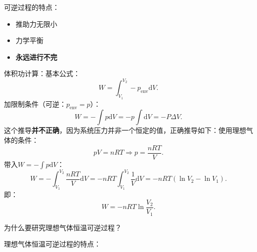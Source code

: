 可逆过程的特点：
\begin{itemize}
    \item 推助力无限小
    \item 力学平衡
    \item \textbf{永远进行不完}
\end{itemize}
体积功计算：基本公式：\[
    W = \int_{V_1}^{V_2} -p_\text{env} \mathrm{d}V
.\]
加限制条件（可逆：$p_\text{env}=p$）：\[
    W = -\int p\mathrm{d}V = -p \int \mathrm{d}V = -P\Delta V
.\]
这个推导\textbf{并不正确}，因为系统压力并非一个恒定的值，正确推导如下：使用理想气体的条件：\[
    pV=nRT \Rightarrow p=\frac{nRT }{V}
.\] 带入$W = -\int p\mathrm{d}V$：\[
    W = -\int_{V_1}^{V_2} \frac{nRT }{V} \mathrm{d}V = -nRT \int_{V_1}^{V_2} \frac{1}{V} \mathrm{d}V = -nRT \left( \ln V_2-\ln V_1 \right)
.\]即：\[\boxed{
    W = -nRT \ln \frac{V_2}{V_1}
.}\]
\begin{question}
    为什么要研究理想气体恒温可逆过程？
\end{question}
理想气体恒温可逆过程的特点：
